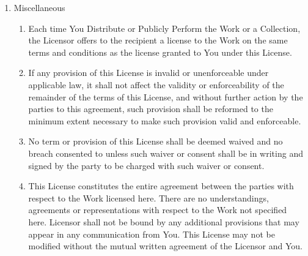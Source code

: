 \begin{enumerate}
\begin{enumerate}
        \end{enumerate}

    \item Miscellaneous

        \begin{enumerate}

            \item Each time You Distribute or Publicly Perform the Work or a
                Collection, the Licensor offers to the recipient a license to
                the Work on the same terms and conditions as the license
                granted to You under this License.
    
            \item If any provision of this License is invalid or unenforceable
                under applicable law, it shall not affect the validity or
                enforceability of the remainder of the terms of this License,
                and without further action by the parties to this agreement,
                such provision shall be reformed to the minimum extent
                necessary to make such provision valid and enforceable.

            \item No term or provision of this License shall be deemed waived
                and no breach consented to unless such waiver or consent shall
                be in writing and signed by the party to be charged with such
                waiver or consent.

            \item This License constitutes the entire agreement between the
                parties with respect to the Work licensed here. There are no
                understandings, agreements or representations with respect to
                the Work not specified here. Licensor shall not be bound by any
                additional provisions that may appear in any communication from
                You. This License may not be modified without the mutual
                written agreement of the Licensor and You.


\end{enumerate}
\end{enumerate}
